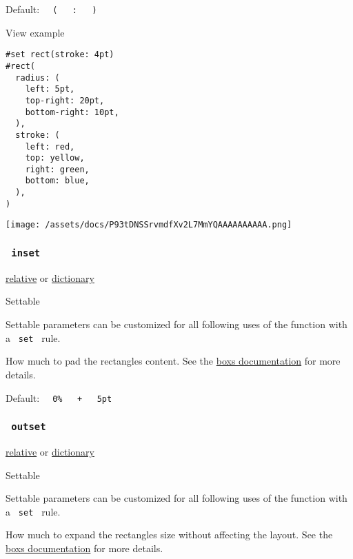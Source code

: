 Default:
\texttt{\ }{\texttt{\ (\ }}\texttt{\ }{\texttt{\ :\ }}\texttt{\ }{\texttt{\ )\ }}\texttt{\ }


View example

\begin{verbatim}
#set rect(stroke: 4pt)
#rect(
  radius: (
    left: 5pt,
    top-right: 20pt,
    bottom-right: 10pt,
  ),
  stroke: (
    left: red,
    top: yellow,
    right: green,
    bottom: blue,
  ),
)
\end{verbatim}

\texttt{[image: /assets/docs/P93tDNSSrvmdfXv2L7MmYQAAAAAAAAAA.png]}

\subsubsection{\texorpdfstring{\texttt{\ inset\ }}{ inset }}\label{parameters-inset}

\href{/docs/reference/layout/relative/}{relative} {or}
\href{/docs/reference/foundations/dictionary/}{dictionary}

{{ Settable }}

\label{parameters-inset-settable-tooltip}
Settable parameters can be customized for all following uses of the
function with a \texttt{\ set\ } rule.

How much to pad the rectangle\textquotesingle s content. See the
\href{/docs/reference/layout/box/\#parameters-outset}{box\textquotesingle s
documentation} for more details.

Default:
\texttt{\ }{\texttt{\ 0\%\ }}\texttt{\ }{\texttt{\ +\ }}\texttt{\ }{\texttt{\ 5pt\ }}\texttt{\ }

\subsubsection{\texorpdfstring{\texttt{\ outset\ }}{ outset }}\label{parameters-outset}

\href{/docs/reference/layout/relative/}{relative} {or}
\href{/docs/reference/foundations/dictionary/}{dictionary}

{{ Settable }}

\label{parameters-outset-settable-tooltip}
Settable parameters can be customized for all following uses of the
function with a \texttt{\ set\ } rule.

How much to expand the rectangle\textquotesingle s size without
affecting the layout. See the
\href{/docs/reference/layout/box/\#parameters-outset}{box\textquotesingle s
documentation} for more details.

